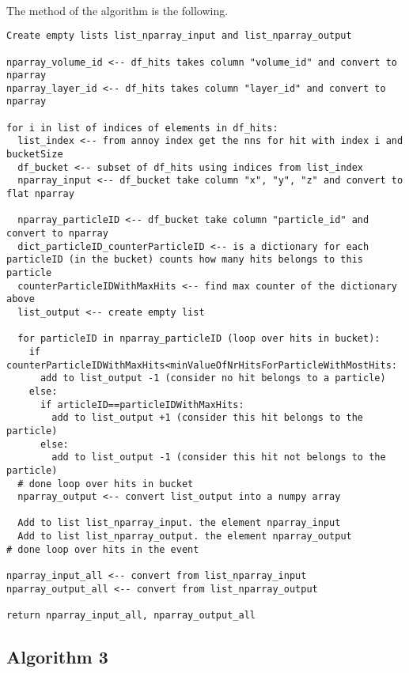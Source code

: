 \ \\The method of the algorithm is the following.
\begin{verbatim}
Create empty lists list_nparray_input and list_nparray_output

nparray_volume_id <-- df_hits takes column "volume_id" and convert to nparray
nparray_layer_id <-- df_hits takes column "layer_id" and convert to nparray

for i in list of indices of elements in df_hits:
  list_index <-- from annoy index get the nns for hit with index i and bucketSize
  df_bucket <-- subset of df_hits using indices from list_index
  nparray_input <-- df_bucket take column "x", "y", "z" and convert to flat nparray 

  nparray_particleID <-- df_bucket take column "particle_id" and convert to nparray
  dict_particleID_counterParticleID <-- is a dictionary for each particleID (in the bucket) counts how many hits belongs to this particle
  counterParticleIDWithMaxHits <-- find max counter of the dictionary above
  list_output <-- create empty list

  for particleID in nparray_particleID (loop over hits in bucket):
    if counterParticleIDWithMaxHits<minValueOfNrHitsForParticleWithMostHits:
      add to list_output -1 (consider no hit belongs to a particle)
    else:
      if articleID==particleIDWithMaxHits:
        add to list_output +1 (consider this hit belongs to the particle) 
      else:
        add to list_output -1 (consider this hit not belongs to the particle)
  # done loop over hits in bucket
  nparray_output <-- convert list_output into a numpy array

  Add to list list_nparray_input. the element nparray_input
  Add to list list_nparray_output. the element nparray_output
# done loop over hits in the event 

nparray_input_all <-- convert from list_nparray_input
nparray_output_all <-- convert from list_nparray_output	

return nparray_input_all, nparray_output_all
\end{verbatim}

\subsection{Algorithm 3}

